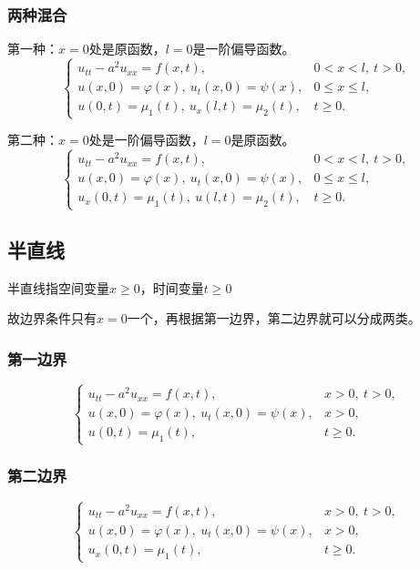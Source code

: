 \documentclass[a4paper, 12pt, oneside]{article} %
\numberwithin{subsection}{section}
\numberwithin{subsubsection}{subsection}
\theoremstyle{plain}
\theoremstyle{definition}
\theoremstyle{remark}
\begin{document}
		
		\subsubsection{两种混合}
		第一种：$x=0$处是原函数，$ l=0$是一阶偏导函数。
		\begin{equation}\label{eq:wave_bounded_mixed1}
			\begin{cases}
				u_{tt} - a^2 u_{xx} = f(x, t), & 0 < x < l, \ t > 0, \\
				u(x, 0) = \varphi(x), \ u_t(x, 0) = \psi(x), & 0 \leq x \leq l, \\
				u(0, t) = \mu_1(t), \ u_x(l, t) = \mu_2(t), & t \geq 0.
			\end{cases}
		\end{equation}
		
		第二种：$x=0$处是一阶偏导函数，$ l=0$是原函数。
		\begin{equation}\label{eq:wave_bounded_mixed2}
			\begin{cases}
				u_{tt} - a^2 u_{xx} = f(x, t), & 0 < x < l, \ t > 0, \\
				u(x, 0) = \varphi(x), \ u_t(x, 0) = \psi(x), & 0 \leq x \leq l, \\
				u_x(0, t) = \mu_1(t), \ u(l, t) = \mu_2(t), & t \geq 0.
			\end{cases}
		\end{equation}
		
		
		
		\subsection{半直线}
		半直线指空间变量$x \geq 0$，时间变量$t \geq 0$
		
		故边界条件只有$x=0$一个，再根据第一边界，第二边界就可以分成两类。
		\subsubsection{第一边界}
		\begin{equation}\label{eq:wave_half_dirichlet}
			\begin{cases}
				u_{tt} - a^2 u_{xx} = f(x, t), & x > 0, \ t > 0, \\
				u(x, 0) = \varphi(x), \ u_t(x, 0) = \psi(x), & x > 0, \\
				u(0, t) = \mu_1(t), & t \geq 0.
			\end{cases}
		\end{equation}
		
		\subsubsection{第二边界}
		\begin{equation}\label{eq:wave_half_neumann}
			\begin{cases}
				u_{tt} - a^2 u_{xx} = f(x, t), &  x > 0, \ t > 0, \\
				u(x, 0) = \varphi(x), \ u_t(x, 0) = \psi(x), & x > 0, \\
				u_x(0, t) = \mu_1(t), & t \geq 0.
			\end{cases}
		\end{equation}
		
\end{document}
